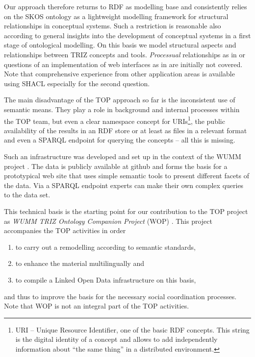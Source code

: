 \documentclass[12pt,a4paper]{article}
\begin{document}
Our approach therefore returns to RDF as modelling base and consistently
relies on the SKOS ontology as a lightweight modelling framework for
structural relationships in conceptual systems. Such a restriction is
reasonable also according to general insights into the development of
conceptual systems in a first stage of ontological modelling. On this basis we
model structural aspects and relationships between TRIZ concepts and tools.
\emph{Processual} relationships as in \cite{4} or questions of an
implementation of web interfaces as in \cite{5} are initially not covered.
Note that comprehensive experience from other application areas is available
using SHACL especially for the second question.

The main disadvantage of the TOP approach so far is the inconsistent use of
semantic means. They play a role in background and internal processes within
the TOP team, but even a clear namespace concept for URIs\footnote{URI –
  Unique Resource Identifier, one of the basic RDF concepts. This string is
  the digital identity of a concept and allows to add independently
  information about “the same thing” in a distributed environment.}, the
public availability of the results in an RDF store or at least as files in a
relevant format and even a SPARQL endpoint for querying the concepts – all
this is missing.

Such an infrastructure was developed and set up in the context of the WUMM
project \cite{26}. The data is publicly available at github \cite{25} and
forms the basis for a prototypical web site \cite{27} that uses simple
semantic tools to present different facets of the data. Via a SPARQL endpoint
\cite{29} experts can make their own complex queries to the data set.

This technical basis is the starting point for our contribution to the TOP
project as \emph{WUMM TRIZ Ontology Companion Project} (WOP) \cite{30}. This
project accompanies the TOP activities in order
\begin{enumerate}
\item to carry out a remodelling according to semantic standards, 
\item to enhance the material multilingually and
\item to compile a Linked Open Data infrastructure on this basis,
\end{enumerate}
and thus to improve the basis for the necessary social coordination processes.
Note that WOP is not an integral part of the TOP activities.
\end{document}
